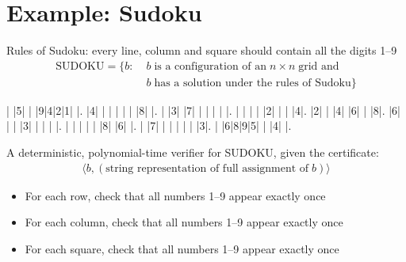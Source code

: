 \documentclass[a4paper]{report}
\newcommand{\bookref}[3]{\marginpar{\faBook{}~#1\\Chapter #2\\Section #3}}
\theoremstyle{definition}
\begin{document}
\section{Example: Sudoku}
\bookref{ER}{28}{28.5.1}
Rules of Sudoku: every line, column and square should contain all the digits 1--9
%
\begin{align*}
\text{SUDOKU} = \{ b : &\;b \; \text{is a configuration of an}\; n \times n \; \text{grid and}\\ & \; b \; \text{has a solution under the rules of Sudoku} \}
\end{align*}
%
\begin{center}
%
\renewcommand*\sudokuformat[1]{\sffamily#1}
\setlength\sudokusize{5.5cm}
\begin{sudoku-block}
| |5| | |9|4|2|1| |.
|4| | | | | | |8| |.
| |3| |7| | | | | |.
| | | | |2| | | |4|.
|2| | |4| |6| | |8|.
|6| | | |3| | | | |.
| | | | | |8| |6| |.
| |7| | | | | | |3|.
| |6|8|9|5| | |4| |.
\end{sudoku-block}
%
%
\end{center}

A deterministic, polynomial-time verifier for SUDOKU, given the certificate:
\begin{align*}
\langle b, (\text{string representation of full assignment of} \;b) \rangle
\end{align*}
%
\begin{itemize}
\item For each row, check that all numbers 1--9 appear exactly once
\item For each column, check that all numbers 1--9 appear exactly once
\item For each square, check that all numbers 1--9 appear exactly once
\end{itemize}
\end{document}
